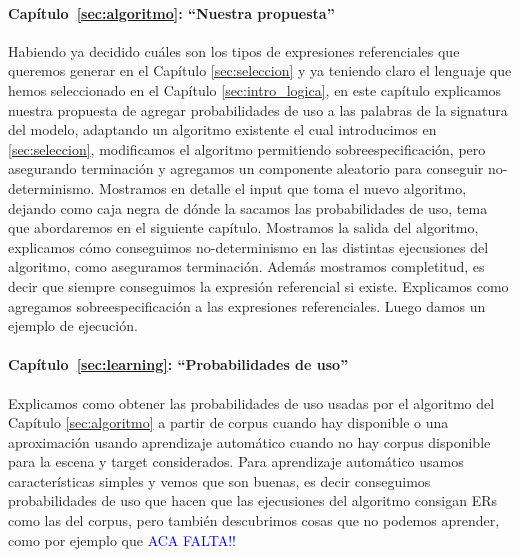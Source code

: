 \paragraph{Cap\'itulo~\ref{sec:algoritmo}: ``Nuestra propuesta''} Habiendo ya decidido cu\'ales son los tipos de expresiones referenciales que queremos generar en el Cap\'itulo \ref{sec:seleccion} y ya teniendo
claro el lenguaje \EL que hemos seleccionado en el Cap\'itulo \ref{sec:intro_logica}, en este cap\'itulo 
explicamos nuestra propuesta de agregar probabilidades de uso a las palabras de la signatura del modelo, adaptando un algoritmo existente 
\cite{arec2:2008:Areces} el cual introducimos en \ref{sec:seleccion}, modificamos el algoritmo permitiendo sobreespecificaci\'on, 
pero asegurando terminaci\'on y agregamos un componente aleatorio para conseguir no-determinismo. Mostramos en detalle el input que toma el
 nuevo algoritmo, dejando como caja negra de d\'onde la sacamos las probabilidades de uso, tema que abordaremos en el siguiente cap\'itulo. 
Mostramos la salida del algoritmo, explicamos c\'omo conseguimos no-determinismo en las distintas ejecusiones del algoritmo, como aseguramos 
terminaci\'on. Adem\'as mostramos completitud, es decir que siempre conseguimos la expresi\'on referencial si existe. Explicamos como agregamos sobreespecificaci\'on a las expresiones referenciales. Luego damos un ejemplo de ejecuci\'on. 


\paragraph{Cap\'itulo~\ref{sec:learning}: ``Probabilidades de uso''} Explicamos como obtener las probabilidades de uso usadas por el algoritmo del Cap\'itulo \ref{sec:algoritmo} a partir de corpus cuando hay disponible o una aproximaci\'on usando aprendizaje autom\'atico cuando no hay corpus disponible para la escena y target considerados. Para aprendizaje autom\'atico usamos caracter\'isticas simples y vemos que son buenas, es decir conseguimos probabilidades de uso que hacen que las ejecusiones del algoritmo consigan ERs como las del corpus, pero tambi\'en descubrimos cosas que no podemos aprender, como por ejemplo que \textcolor{blue}{ACA FALTA!! }

